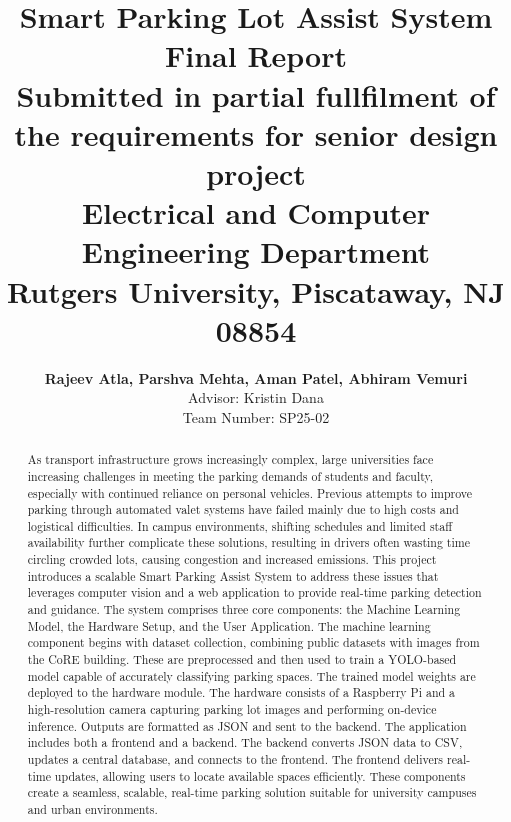\documentclass[conference]{IEEEtran}
\begin{document}
\title{Smart Parking Lot Assist System\\
{\footnotesize \textbf{
    Final Report \\
    Submitted in partial fullfilment of the requirements for senior design project\\
    Electrical and Computer Engineering Department \\
    Rutgers University, Piscataway, NJ 08854 \\
}
}
}

\author{
\textbf{Rajeev Atla, Parshva Mehta, Aman Patel, Abhiram Vemuri} \\
Advisor: Kristin Dana\\
Team Number: SP25-02 
}

\maketitle

\begin{abstract}
    As transport infrastructure grows increasingly complex, 
    large universities face increasing challenges in meeting the parking demands of students and faculty, 
    especially with continued reliance on personal vehicles. 
    Previous attempts to improve parking through automated valet systems have failed mainly due to high costs and logistical difficulties. 
    In campus environments, 
    shifting schedules and limited staff availability further complicate these solutions, 
    resulting in drivers often wasting time circling crowded lots, 
    causing congestion and increased emissions.
    This project introduces a scalable Smart Parking Assist System to address these issues that leverages computer vision and a web application to provide real-time parking detection and guidance. 
    The system comprises three core components: 
    the Machine Learning Model, 
    the Hardware Setup, 
    and the User Application.
    The machine learning component begins with dataset collection, 
    combining public datasets with images from the CoRE building. 
    These are preprocessed and then used to train a YOLO-based model capable of accurately classifying parking spaces. 
    The trained model weights are deployed to the hardware module.
    The hardware consists of a Raspberry Pi and a high-resolution camera capturing parking lot images and performing on-device inference. 
    Outputs are formatted as JSON and sent to the backend.
    The application includes both a frontend and a backend. 
    The backend converts JSON data to CSV, 
    updates a central database, 
    and connects to the frontend. 
    The frontend delivers real-time updates, 
    allowing users to locate available spaces efficiently.
    These components create a seamless, 
    scalable, 
    real-time parking solution suitable for university campuses and urban environments.    
\end{abstract}
\end{document}
